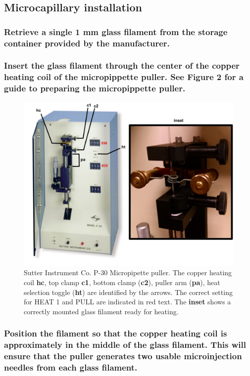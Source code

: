 \documentclass[11pt]{article}
\begin{document}
\subsection{{\sffamily } Microcapillary installation}
\label{sec:orgheadline40}
\subsubsection{{\sffamily } Retrieve a single 1 mm glass filament from the storage container provided by the manufacturer.}
\label{sec:orgheadline21}
\subsubsection{{\sffamily } Insert the  glass filament through the center of the copper heating coil of the micropippette puller. See \textbf{Figure 2} for a guide to preparing the micropippette puller.}
\label{sec:orgheadline22}

\begin{figure}[h]
\centering
\includegraphics[width=0.6\linewidth]{./img/figure2.pdf}
\caption{Sutter Instrument Co. P-30 Micropipette puller. The copper heating coil \textbf{hc}, top clamp \textbf{c1}, bottom clamp (\textbf{c2}), puller arm (\textbf{pa}), heat selection toggle (\textbf{ht}) are identified by the arrows. The correct setting for HEAT 1 and PULL are indicated in red text. The \textbf{inset} shows a correctly mounted glass filament ready for heating.}
\end{figure}

\subsubsection{{\sffamily } Position the filament so that the copper heating coil is approximately in the middle of the glass filament. This will ensure that the puller generates two usable microinjection needles from each glass filament.}
\label{sec:orgheadline23}
\end{document}
